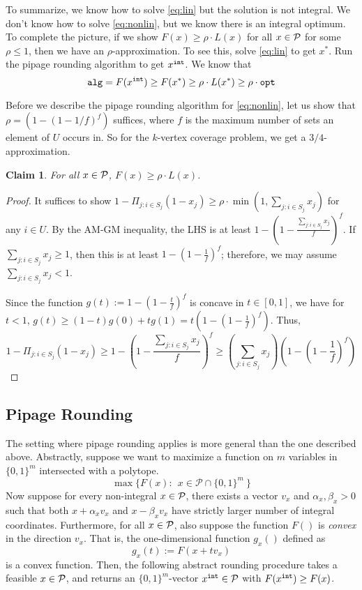 \documentclass[11pt]{article}
\newtheorem{claim}{Claim}
\def\opt{{\tt opt}}
\def\alg{{\tt alg}}
\begin{document}
 \def\xint{x^{{\tt int}}}
To summarize, we know how to solve \eqref{eq:lin} but the solution is not integral. We don't know how to solve
\eqref{eq:nonlin}, but we know there is an integral optimum. To complete the picture, if we show $F(x) \ge \rho\cdot L(x)$ for all $x\in \P$ for some $\rho \le 1$, then we have an $\rho$-approximation. To see this, solve \eqref{eq:lin} to get $x^*$. Run the pipage rounding algorithm to get $\xint$. We know that $$\alg = F(\xint) \ge F(x^*) \ge \rho\cdot L(x^*) \ge \rho \cdot\opt$$

\noindent
Before we describe the pipage rounding algorithm for \eqref{eq:nonlin}, let us show that $\rho = \left(1 - (1 - 1/f)^f\right)$ suffices, where $f$ is the maximum number of sets an element of $U$ occurs in. So for the $k$-vertex coverage problem, we get a $3/4$-approximation.

\begin{claim}
For all $x\in \P$, $F(x) \ge \rho\cdot L(x)$.
\end{claim}
\begin{proof}
It suffices to show $1 - \Pi_{j:i \in S_j}(1-x_j) \ge \rho\cdot \min(1,\sum_{j:i\in S_j} x_j)$ for any $i\in U$.
By the AM-GM inequality, the LHS is at least $1 - (1 - \frac{\sum_{j:i\in S_j} x_j}{f})^{f}$. 
If $\sum_{j:i\in S_j} x_j \ge 1$, then this is at least $1 - (1 - \frac{1}{f})^f$; therefore, we may assume
$\sum_{j:i\in S_j} x_j < 1$.

Since the function \mbox{$g(t) := 1- (1 - \frac{t}{f})^f$} is concave in $t\in [0,1]$, 
we have for $t < 1$, $g(t) \ge (1-t)g(0) + tg(1) =t(1 - (1 - \frac{1}{f})^f)$.  Thus, 
$$1 - \Pi_{j:i \in S_j}(1-x_j) \ge 1 - \left(1 - \frac{\sum_{j:i\in S_j} x_j}{f}\right)^{f} \ge \left(\sum_{j:i\in S_j} x_j\right) \left(1 - \left(1-\frac{1}{f}\right)^f \right)$$
\end{proof}

\subsection*{Pipage Rounding} 
The setting where pipage rounding applies is more general than the one described above. Abstractly, 
suppose we want to maximize a function on $m$ variables in $\{0,1\}^m$ intersected with a polytope.
$$\max \{F(x): ~~ x\in {\mathcal P} \cap \{0,1\}^m ~\}$$
Now suppose for every non-integral $x\in \P$, there exists a vector $v_x$ and $\alpha_x,\beta_x > 0$ such that both $x+\alpha_x v_x$ and $x - \beta_x v_x$ have strictly larger number of integral coordinates. Furthermore, 
for all $x\in \P$, also suppose the function $F()$ is {\em convex} in the direction $v_x$. That is, the one-dimensional function $g_{x}()$ defined as $$g_{x}(t) := F(x + tv_x)$$ is a convex function. Then, the following abstract rounding procedure takes a feasible $x\in \P$, and returns an $\{0,1\}^m$-vector $\xint\in \P$ with 
$F(\xint)\ge F(x)$. \\
\end{document}
